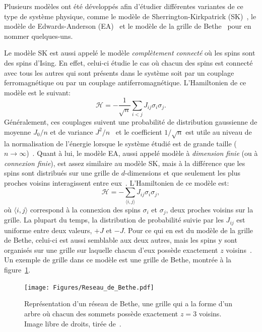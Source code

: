 Plusieurs modèles ont été développés afin d'étudier différentes variantes de ce type de système physique, comme le modèle de Sherrington-Kirkpatrick (SK)~\cite{SKspinglass}, le modèle de Edwards-Anderson (EA)~\cite{EAspinglass} et le modèle de la grille de Bethe~\cite{Bethespinglass} pour en nommer quelques-uns. %

Le modèle SK est aussi appelé le modèle \emph{complètement connecté} où les spins sont des spins d'Ising.
En effet, celui-ci étudie le cas où chacun des spins est connecté avec tous les autres qui sont présents dans le système soit par un couplage ferromagnétique ou par un couplage antiferromagnétique.
L'Hamiltonien de ce modèle est le suivant:
\begin{equation}
    \mathcal{H} = -\frac{1}{\sqrt{n}}\sum_{i < j} J_{ij}\sigma_i\sigma_j.
\end{equation}
Généralement, ces couplages suivent une probabilité de distribution gaussienne de moyenne $J_0 / n$ et de variance $J^2 / n$~\cite{rodriguez2021sherrington} et le coefficient $1/\sqrt{n}$ est utile au niveau de la normalisation de l'énergie lorsque le système étudié est de grande taille ($n \rightarrow \infty$)~\cite{stein2013spin}.
Quant à lui, le modèle EA, aussi appelé modèle à \emph{dimension finie} (ou à \emph{connexion finie}), est assez similaire au modèle SK, mais à la différence que les spins sont distribués sur une grille de $d$-dimensions et que seulement les plus proches voisins interagissent entre eux~\cite{stein2013spin}.
L'Hamiltonien de ce modèle est:
\begin{equation}
    \mathcal{H} = -\sum_{\langle i, j \rangle} J_{ij}\sigma_i\sigma_j,
\end{equation}
où $\langle i, j \rangle$ correspond à la connexion des spins $\sigma_i$ et $\sigma_j$, deux proches voisins sur la grille.
La plupart du temps, la distribution de probabilité suivie par les $J_{ij}$ est uniforme entre deux valeurs, $+J$ et $-J$\cite{stein2013spin}.
Pour ce qui en est du modèle de la grille de Bethe, celui-ci est aussi semblable aux deux autres, mais les spins y sont organisés sur une grille sur laquelle chacun d'eux possède exactement $z$ voisins~\cite{viana1985phase}.
Un exemple de grille dans ce modèle est une grille de Bethe, montrée à la figure~\ref{fig:bethe-lattice}.
\begin{figure}[h]
    \centering
    \texttt{[image: Figures/Reseau\_de\_Bethe.pdf]}
    \caption[Représentation d'un réseau de Bethe avec $z = 3$ voisins.]{Représentation d'un réseau de Bethe, une grille qui a la forme d'un arbre où chacun des sommets possède exactement $z = 3$ voisins. Image libre de droits, tirée de~\protect\cite{wiki:Bethe-lattice}.}
    \label{fig:bethe-lattice}
\end{figure}

